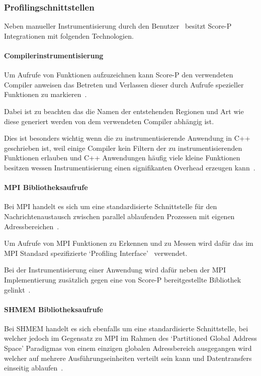\documentclass[german,proseminar,hyperref,utf8]{zihpub}
\begin{document}
    \subsubsection{Profilingschnittstellen}
    Neben manueller Instrumentisierung durch den Benutzer~
    besitzt Score-P Integrationen mit folgenden Technologien.

    \paragraph{Compilerinstrumentisierung}
    Um Aufrufe von Funktionen aufzuzeichnen kann Score-P den verwendeten Compiler
    anweisen das Betreten und Verlassen dieser durch Aufrufe spezieller Funktionen
    zu markieren~.

    Dabei ist zu beachten das die Namen der entstehenden Regionen und Art wie diese generiert
    werden von dem verwendeten Compiler abhängig ist.

    Dies ist besonders wichtig wenn die zu instrumentisierende Anwendung in C++ geschrieben ist,
    weil einige Compiler kein Filtern der zu instrumentisierenden Funktionen erlauben und C++
    Anwendungen häufig viele kleine Funktionen besitzen wessen Instrumentisierung einen signifikanten
    Overhead erzeugen kann~.

    \paragraph{MPI Bibliotheksaufrufe}
    Bei MPI handelt es sich um eine standardisierte Schnittstelle für den Nachrichtenaustausch
    zwischen parallel ablaufenden Prozessen mit eigenen Adressbereichen~.

    Um Aufrufe von MPI Funktionen zu Erkennen und zu Messen wird dafür das im MPI Standard
    spezifizierte `Profiling Interface'~ verwendet.

    Bei der Instrumentisierung einer Anwendung wird dafür neben der MPI Implementierung zusätzlich
    gegen eine von Score-P bereitgestellte Bibliothek gelinkt~.

    \paragraph{SHMEM Bibliotheksaufrufe}
    Bei SHMEM handelt es sich ebenfalls um eine standardisierte Schnittstelle, bei welcher jedoch
    im Gegensatz zu MPI im Rahmen des `Partitioned Global Address Space' Paradigmas von einem
    einzigen globalen Adressbereich ausgegangen wird welcher auf mehrere Ausführungseinheiten
    verteilt sein kann und Datentransfers einseitig ablaufen~.
\end{document}
